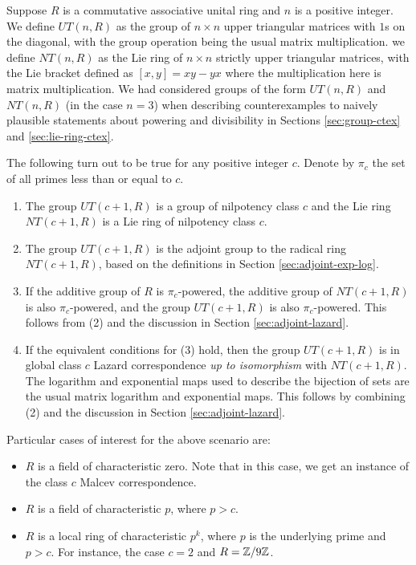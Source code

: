 Suppose $R$ is a commutative associative unital ring and $n$ is a
positive integer. We define $UT(n,R)$ as the group of $n \times n$
upper triangular matrices with $1$s on the diagonal, with the group
operation being the usual matrix multiplication. we define $NT(n,R)$
as the Lie ring of $n \times n$ strictly upper triangular matrices,
with the Lie bracket defined as $[x,y] = xy - yx$ where the
multiplication here is matrix multiplication. We had considered groups
of the form $UT(n,R)$ and $NT(n,R)$ (in the case $n = 3$) when
describing counterexamples to naively plausible statements about
powering and divisibility in Sections \ref{sec:group-ctex} and
\ref{sec:lie-ring-ctex}.

The following turn out to be true for any positive integer $c$. Denote
by $\pi_c$ the set of all primes less than or equal to $c$.

\begin{enumerate}
\item The group $UT(c+1,R)$ is a group of nilpotency class $c$ and the
  Lie ring $NT(c+1,R)$ is a Lie ring of nilpotency class $c$.
\item The group $UT(c+1,R)$ is the adjoint group to the radical ring
  $NT(c+1,R)$, based on the definitions in Section
  \ref{sec:adjoint-exp-log}.
\item If the additive group of $R$ is $\pi_c$-powered, the additive
  group of $NT(c+1,R)$ is also $\pi_c$-powered, and the group
  $UT(c+1,R)$ is also $\pi_c$-powered. This follows from (2) and the
  discussion in Section \ref{sec:adjoint-lazard}.
\item If the equivalent conditions for (3) hold, then the group
  $UT(c+1,R)$ is in global class $c$ Lazard correspondence {\em up to
  isomorphism} with $NT(c+1,R)$. The logarithm and exponential maps
  used to describe the bijection of sets are the usual matrix
  logarithm and exponential maps. This follows by combining (2) and
  the discussion in Section \ref{sec:adjoint-lazard}.
\end{enumerate}

Particular cases of interest for the above scenario are:

\begin{itemize}
\item $R$ is a field of characteristic zero. Note that in this case,
  we get an instance of the class $c$ Malcev correspondence.
\item $R$ is a field of characteristic $p$, where $p > c$.
\item $R$ is a local ring of characteristic $p^k$, where $p$ is the
  underlying prime and $p > c$. For instance, the case $c = 2$ and $R
  = \mathbb{Z}/9\mathbb{Z}$.
\end{itemize}

